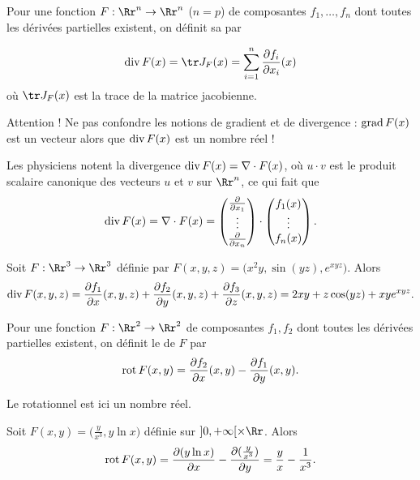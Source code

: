 \documentclass[11pt, class=report,crop=false]{standalone}
\begin{document}
\bigskip
  

Pour une fonction  $F : \Rr^n \to \Rr^n$ ($n=p$)
de composantes $f_1,\ldots,f_n$ dont toutes les dérivées partielles existent, on définit sa  par

$$\diver F (x) = \tr J_F (x)
= \sum_{i=1}^n \frac{\partial f_i}{\partial x_i}(x)$$
où $\tr J_F(x)$ est la trace de la matrice jacobienne. 

Attention ! Ne pas confondre les notions de gradient et de divergence : $\operatorname{grad} F(x)$ est un vecteur alors que $\operatorname{div} F(x)$ est un nombre réel !

Les physiciens notent la divergence $\operatorname{div} F(x)=\nabla \cdot F(x)$, 
où $u \cdot v$ est le produit scalaire canonique des vecteurs $u$ et $v$ sur $\Rr^n$, ce qui fait que
$$\operatorname{div} F (x) = \nabla \cdot F(x)
= \begin{pmatrix}
\frac{\partial}{\partial x_1}\\
\vdots\\
\frac{\partial }{\partial x_n}
\end{pmatrix}
\cdot 
\begin{pmatrix}
f_1(x) \\
\vdots \\
f_n(x)
\end{pmatrix}.
$$


\begin{exemple}
Soit $F : \Rr^3 \to \Rr^3$ définie par 
$F(x,y,z) = \big( x^2y, \sin(yz), e^{xyz} \big)$.
Alors $$\operatorname{div} F (x,y,z) = 
\frac{\partial f_1}{\partial x}(x,y,z)+
\frac{\partial f_2}{\partial y}(x,y,z)+
\frac{\partial f_3}{\partial z}(x,y,z)
= 2xy + z\cos(yz) + xye^{xyz}.
$$
\end{exemple}


\bigskip
\bigskip


Pour une fonction  $F : \Rr^2 \to \Rr^2$ de composantes $f_1,f_2$ dont toutes les dérivées partielles existent, on définit le  de $F$ par
$$\operatorname{rot} F (x,y) = \frac{\partial f_2}{\partial x}(x,y)-\frac{\partial f_1}{\partial y}(x,y).
$$

Le rotationnel est ici un nombre réel.

\begin{exemple}
Soit $F(x,y) = \big( \frac{y}{x^3},  y\ln x \big)$ définie sur $]0,+\infty[ \times \Rr$. Alors
$$\operatorname{rot} F (x,y) = 
\frac{\partial (y\ln x)}{\partial x} -    \frac{\partial (\frac{y}{x^3})}{\partial y}
    = \frac{y}{x} - \frac{1}{x^3}.
$$
\end{exemple}
\end{document}
